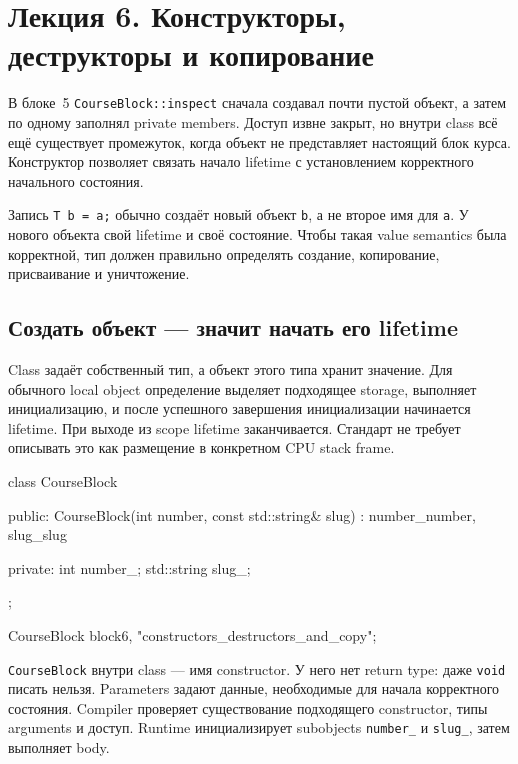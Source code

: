 
\section{Лекция 6. Конструкторы, деструкторы и копирование}
\label{sec:lecture-06}

В блоке~5 \texttt{CourseBlock::inspect} сначала создавал почти пустой объект,
а затем по одному заполнял private members. Доступ извне закрыт, но внутри
class всё ещё существует промежуток, когда объект не представляет настоящий
блок курса. Конструктор позволяет связать начало lifetime с установлением
корректного начального состояния.

\begin{importantbox}[Идея]
Запись \texttt{T b = a;} обычно создаёт новый объект \texttt{b}, а не второе
имя для \texttt{a}. У нового объекта свой lifetime и своё состояние. Чтобы
такая value semantics была корректной, тип должен правильно определять
создание, копирование, присваивание и уничтожение.
\end{importantbox}

\subsection{Создать объект --- значит начать его lifetime}

Class задаёт собственный тип, а объект этого типа хранит значение. Для
обычного local object определение выделяет подходящее storage, выполняет
инициализацию, и после успешного завершения инициализации начинается lifetime.
При выходе из scope lifetime заканчивается. Стандарт не требует описывать это
как размещение в конкретном CPU stack frame.

\begin{cppcode}
class CourseBlock {
public:
    CourseBlock(int number, const std::string& slug)
        : number_{number}, slug_{slug} {}

private:
    int number_;
    std::string slug_;
};

CourseBlock block{6, "constructors_destructors_and_copy"};
\end{cppcode}

\texttt{CourseBlock} внутри class --- имя constructor. У него нет return type:
даже \texttt{void} писать нельзя. Parameters задают данные, необходимые для
начала корректного состояния. Compiler проверяет существование подходящего
constructor, типы arguments и доступ. Runtime инициализирует subobjects
\texttt{number\_} и \texttt{slug\_}, затем выполняет body.

